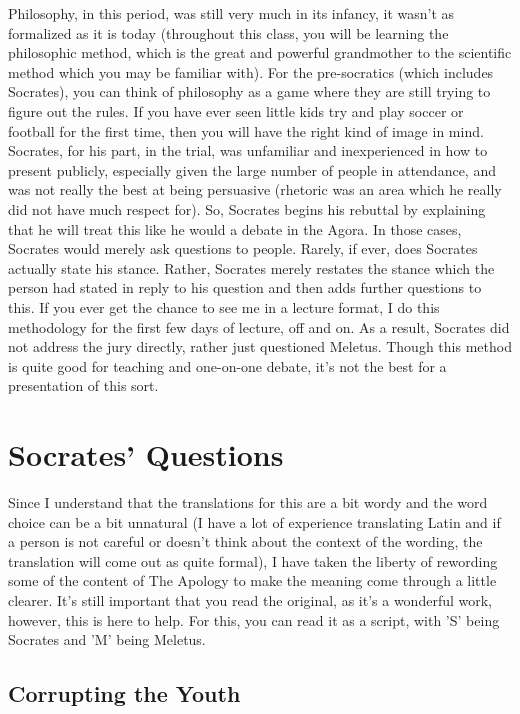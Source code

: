Philosophy, in this period, was still very much in its infancy, it wasn't as formalized as it is today (throughout this class, you will be learning the philosophic method, which is the great and powerful grandmother to the scientific method which you may be familiar with). For the pre-socratics (which includes Socrates), you can think of philosophy as a game where they are still trying to figure out the rules. If you have ever seen little kids try and play soccer or football for the first time, then you will have the right kind of image in mind.  Socrates, for his part, in the trial, was unfamiliar and inexperienced in how to present publicly, especially given the large number of people in attendance, and was not really the best at being persuasive (rhetoric was an area which he really did not have much respect for). So, Socrates begins his rebuttal by explaining that he will treat this like he would a debate in the Agora. In those cases, Socrates would merely ask questions to people. Rarely, if ever, does Socrates actually state his stance. Rather, Socrates merely restates the stance which the person had stated in reply to his question and then adds further questions to this. If you ever get the chance to see me in a lecture format, I do this methodology for the first few days of lecture, off and on. As a result, Socrates did not address the jury directly, rather just questioned Meletus. Though this method is quite good for teaching and one-on-one debate, it's not the best for a presentation of this sort. 
\section{Socrates' Questions}

Since I understand that the translations for this are a bit wordy and the word choice can be a bit unnatural (I have a lot of experience translating Latin and if a person is not careful or doesn't think about the context of the wording, the translation will come out as quite formal), I have taken the liberty of rewording some of the content of The Apology to make the meaning come through a little clearer. It's still important that you read the original, as it's a wonderful work, however, this is here to help. For this, you can read it as a script, with 'S' being Socrates and 'M' being Meletus.
\subsection{Corrupting the Youth}

